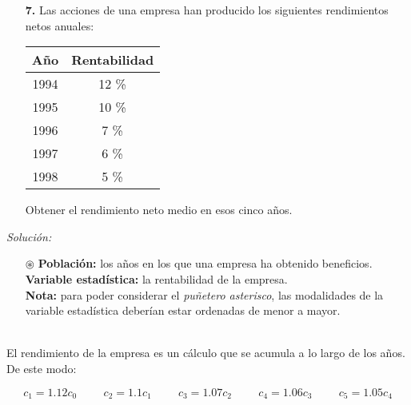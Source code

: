 \documentclass[11pt,a4paper]{article}
\theoremstyle{definition}
\begin{document}


\pagebreak

\begin{itemize}
	\item[\textbf{7.}] Las acciones de una empresa han producido los siguientes rendimientos netos anuales:


\begin{table}[!htbp]
\hspace{5.7cm}
\begin{tabular}{cc}

Año & Rentabilidad \\ \hline
1994 & 12 \% \\
1995 & 10 \% \\
1996 & 7 \% \\
1997 & 6 \% \\
1998 & 5 \% \\
\end{tabular}
\end{table}

Obtener el rendimiento neto medio en esos cinco años.
\end{itemize}

{\color{grey}\hrulefill}

\emph{Solución:}

\begin{itemize}
	\item[$\circledast$] \textbf{Población:} los años en los que una empresa ha obtenido beneficios. \\ \textbf{Variable estadística:} la rentabilidad de la empresa. \\
	\small{\textbf{Nota:} para poder considerar el \emph{puñetero asterisco}, las modalidades de la variable estadística deberían estar ordenadas de menor a mayor.}
\end{itemize}
\hspace{1cm} \\
El rendimiento de la empresa es un cálculo que se acumula a lo largo de los años. De este modo:

$$ c_1 = 1.12c_0 \hspace{1cm} c_2 = 1.1c_1 \hspace{1cm} c_3 = 1.07c_2 \hspace{1cm} c_4 = 1.06c_3 \hspace{1cm} c_5 = 1.05c_4 $$
\end{document}
